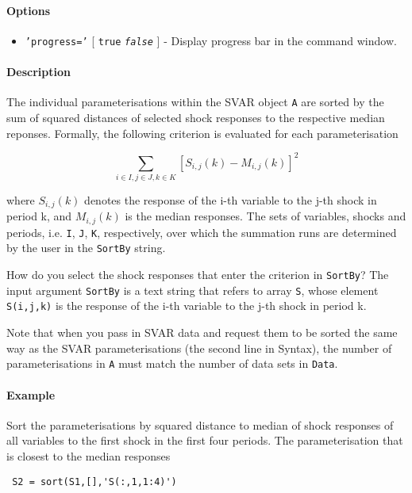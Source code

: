  \paragraph{Options}
 
 \begin{itemize}
 \item
   \texttt{'progress='} {[} \texttt{true} \textbar{}
   \emph{\texttt{false}} {]} - Display progress bar in the command
   window.
 \end{itemize}
 
 \paragraph{Description}
 
 The individual parameterisations within the SVAR object \texttt{A} are
 sorted by the sum of squared distances of selected shock responses to
 the respective median reponses. Formally, the following criterion is
 evaluated for each parameterisation
 
 \[ \sum_{i\in I,j\in J,k\in K} \left[ S_{i,j}(k) - M_{i,j}(k) \right]^2 \]
 
 where $S_{i,j}(k)$ denotes the response of the i-th variable to the j-th
 shock in period k, and $M_{i,j}(k)$ is the median responses. The sets of
 variables, shocks and periods, i.e. \texttt{I}, \texttt{J}, \texttt{K},
 respectively, over which the summation runs are determined by the user
 in the \texttt{SortBy} string.
 
 How do you select the shock responses that enter the criterion in
 \texttt{SortBy}? The input argument \texttt{SortBy} is a text string
 that refers to array \texttt{S}, whose element \texttt{S(i,j,k)} is the
 response of the i-th variable to the j-th shock in period k.
 
 Note that when you pass in SVAR data and request them to be sorted the
 same way as the SVAR parameterisations (the second line in Syntax), the
 number of parameterisations in \texttt{A} must match the number of data
 sets in \texttt{Data}.
 
 \paragraph{Example}
 
 Sort the parameterisations by squared distance to median of shock
 responses of all variables to the first shock in the first four periods.
 The parameterisation that is closest to the median responses
 
 \begin{verbatim}
 S2 = sort(S1,[],'S(:,1,1:4)')
 \end{verbatim}


